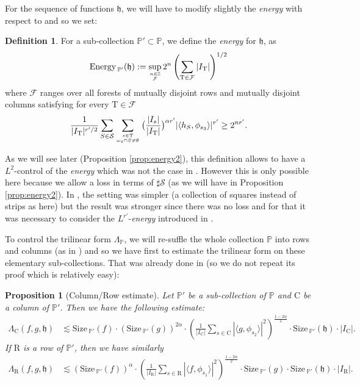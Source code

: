 \documentclass[a4paper,11pt,oneside]{amsart}
\newcommand{\hh}{\mathfrak{h}}
\newcommand{\PP}{\mathbb{P}}
\newcommand{\FF}{\mathcal{F}}
\newcommand{\CC}{\mathrm{C}}
\newcommand{\RR}{\mathrm{R}}
\newcommand{\TT}{\mathrm{T}}
\newcommand{\size}{\mathrm{Size\, }}
\newcommand{\energy}{\mathrm{Energy \,}}
\theoremstyle{plain}
\newtheorem{proposition}[theorem]{Proposition}
\theoremstyle{definition}
\newtheorem{definition}[theorem]{Definition}
\begin{document}
For the sequence of functions $\hh$, we will have to modify slightly the {\it energy} with respect to \cite{BB} and so we set:

\begin{definition}
For a sub-collection $\PP' \subset \PP$, we define the {\it energy} for $\hh$, as 
$$ \energy_{\PP'}(\hh):=\sup_{n\in{\mathbb Z} \atop \FF} 2^{n} \left(\sum_{\TT \in \FF} |I_{\TT}| \right)^{1/2}$$
where  $\FF$ ranges over all forests of mutually disjoint rows and mutually disjoint columns satisfying for every $\TT\in \FF$
$$ \frac{1}{|I_{\TT}|^{r'/2}} \sum_{S\in \mathcal{S}} \sum_{s\in \TT \atop \omega_s \cap S\neq \emptyset} \big(\frac{|I_s|}{|I_{\TT}|}\big)^{\alpha r'} |\langle h_S,\phi_{s_3}\rangle|^{r'} \geq 2^{nr'}.$$
\end{definition}

As we will see later (Proposition \ref{prop:energy2}), this definition allows to have a $L^2$-control of the {\it energy} which was not the case in \cite{BB}. However this is only possible here because we allow a loss in terms of $\sharp{\mathcal S}$ (as we will have in Proposition \ref{prop:energy2}). In \cite{BB}, the setting was simpler (a collection of squares instead of strips as here) but the result was stronger since there was no loss and for that it was necessary to consider the $L^{r'}$-{\it energy} introduced in \cite{BB}.

\medskip

To control the trilinear form $\Lambda_{\PP}$, we will re-suffle the whole collection $\PP$ into rows and columns (as in \cite{BB}) and so we have first to estimate the trilinear form on these elementary sub-collections. That was already done in \cite[Proposition 2.5]{BB} (so we do not repeat its proof which is relatively easy):

\begin{proposition}[Column/Row estimate] \label{prop:tree} Let $\PP'$ be a sub-collection of $\PP$ and $\CC$ be a column of $\PP'$. Then we have the following estimate:
\begin{align*}
\Lambda_{\CC}(f,g,\hh) & \lesssim \size_{\PP'}(f) \cdot (\size_{\PP'}(g))^{2\alpha} \cdot \left(\frac{1}{|I_{\CC}|} \sum_{s\in \CC} |\langle g, \phi_{s_2}\rangle |^2\right)^{\frac{1-2\alpha}{2}} \cdot \size_{\PP'}(\hh) \cdot |I_{\CC}|.
\end{align*}
If $\RR$ is a row of $\PP'$, then we have similarly
\begin{align*}
\Lambda_{\RR}(f,g,\hh) & \lesssim (\size_{\PP'}(f))^{\alpha} \cdot \left(\frac{1}{|I_{\RR}|} \sum_{s\in \RR} |\langle f, \phi_{s_1}\rangle |^2\right)^{\frac{1-2\alpha}{2}} \cdot \size_{\PP'}(g) \cdot \size_{\PP'}(\hh) \cdot |I_{\RR}|.
\end{align*}
\end{proposition}
\end{document}
